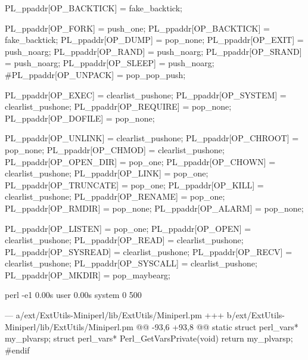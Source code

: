 \documentclass[mathserif,hyperref={urlcolor=cyan,colorlinks=true}]{beamer}
\begin{document}
{{\begin{frame}[fragile]
\begin{ccode}
PL_ppaddr[OP_BACKTICK] = fake_backtick;

\end{ccode}
\end{frame}


\begin{frame}[fragile]
\begin{perlcode}
    PL_ppaddr[OP_FORK] = push_one;
    PL_ppaddr[OP_BACKTICK] = fake_backtick;
    PL_ppaddr[OP_DUMP] = pop_none;
    PL_ppaddr[OP_EXIT] = push_noarg;
    PL_ppaddr[OP_RAND] = push_noarg;
    PL_ppaddr[OP_SRAND] = push_noarg;
    PL_ppaddr[OP_SLEEP] = push_noarg;
    #PL_ppaddr[OP_UNPACK] = pop_pop_push;

    PL_ppaddr[OP_EXEC] = clearlist_pushone;
    PL_ppaddr[OP_SYSTEM] = clearlist_pushone;
    PL_ppaddr[OP_REQUIRE] = pop_none;
    PL_ppaddr[OP_DOFILE] = pop_none;

    PL_ppaddr[OP_UNLINK] = clearlist_pushone;
    PL_ppaddr[OP_CHROOT] = pop_none;
    PL_ppaddr[OP_CHMOD] = clearlist_pushone;
    PL_ppaddr[OP_OPEN_DIR] = pop_one;
    PL_ppaddr[OP_CHOWN] = clearlist_pushone;
    PL_ppaddr[OP_LINK] = pop_one;
    PL_ppaddr[OP_TRUNCATE] = pop_one;
    PL_ppaddr[OP_KILL] = clearlist_pushone;
    PL_ppaddr[OP_RENAME] = pop_one;
    PL_ppaddr[OP_RMDIR] = pop_none;
    PL_ppaddr[OP_ALARM] = pop_none;

    PL_ppaddr[OP_LISTEN] = pop_one;
    PL_ppaddr[OP_OPEN] = clearlist_pushone;
    PL_ppaddr[OP_READ] = clearlist_pushone;
    PL_ppaddr[OP_SYSREAD] = clearlist_pushone;
    PL_ppaddr[OP_RECV] = clearlist_pushone;
    PL_ppaddr[OP_SYSCALL] = clearlist_pushone;
    PL_ppaddr[OP_MKDIR] = pop_maybearg;
\end{perlcode}
\end{frame}



\begin{frame}[fragile]
\begin{bashcode}
perl -e1  0.00s user 0.00s system 0%
500
\end{bashcode}
\end{frame}

\begin{frame}[fragile]
\begin{diffcode}
--- a/ext/ExtUtils-Miniperl/lib/ExtUtils/Miniperl.pm
+++ b/ext/ExtUtils-Miniperl/lib/ExtUtils/Miniperl.pm
@@ -93,6 +93,8 @@ static struct perl_vars* my_plvarsp;
 struct perl_vars* Perl_GetVarsPrivate(void) { return my_plvarsp; }
 #endif


\end{diffcode}
\end{frame}}}
\end{document}
